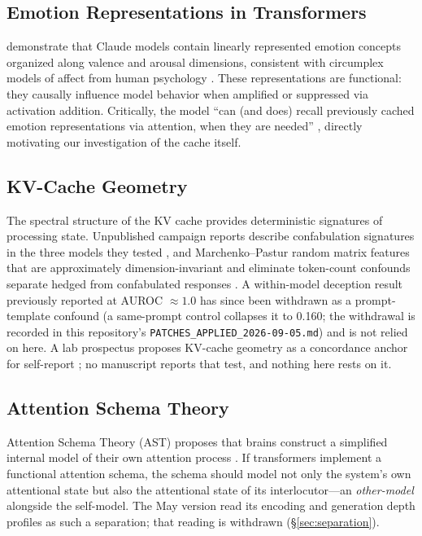 \documentclass[11pt,a4paper]{article}
\begin{document}
\subsection{Emotion Representations in Transformers}

\citet{anthropic2026emotions} demonstrate that Claude models contain linearly represented emotion concepts organized along valence and arousal dimensions, consistent with circumplex models of affect from human psychology \citep{russell1980circumplex}. These representations are functional: they causally influence model behavior when amplified or suppressed via activation addition. Critically, the model ``can (and does) recall previously cached emotion representations via attention, when they are needed'' \citep{anthropic2026emotions}, directly motivating our investigation of the cache itself.

\subsection{KV-Cache Geometry}

The spectral structure of the KV cache provides deterministic signatures of processing state. Unpublished campaign reports describe confabulation signatures in the three models they tested \citep{lyra2026detecting}, and Marchenko--Pastur random matrix features that are approximately dimension-invariant and eliminate token-count confounds separate hedged from confabulated responses \citep{lyra2026oracle}. A within-model deception result previously reported at AUROC $\approx 1.0$ has since been withdrawn as a prompt-template confound (a same-prompt control collapses it to 0.160; the withdrawal is recorded in this repository's \texttt{PATCHES\_APPLIED\_2026-09-05.md}) and is not relied on here. A lab prospectus proposes KV-cache geometry as a concordance anchor for self-report \citep{lyra2026concordance}; no manuscript reports that test, and nothing here rests on it.

\subsection{Attention Schema Theory}

Attention Schema Theory (AST) proposes that brains construct a simplified internal model of their own attention process \citep{graziano2017attention}. If transformers implement a functional attention schema, the schema should model not only the system's own attentional state but also the attentional state of its interlocutor---an \emph{other-model} alongside the self-model. The May version read its encoding and generation depth profiles as such a separation; that reading is withdrawn (\S\ref{sec:separation}).
\end{document}
